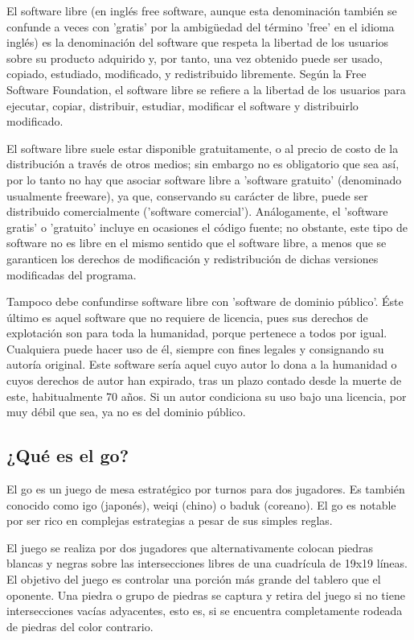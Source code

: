 \documentclass[12pt,a4paper]{report}
\begin{document}
El software libre (en inglés free software, aunque esta denominación también se
confunde a veces con 'gratis' por la ambigüedad del término 'free' en el idioma
inglés) es la denominación del software que respeta la libertad de los usuarios
sobre su producto adquirido y, por tanto, una vez obtenido puede ser usado,
copiado, estudiado, modificado, y redistribuido libremente. Según la Free
Software Foundation, el software libre se refiere a la libertad de los usuarios
para ejecutar, copiar, distribuir, estudiar, modificar el software y
distribuirlo modificado.

El software libre suele estar disponible gratuitamente, o al precio de costo de
la distribución a través de otros medios; sin embargo no es obligatorio que sea
así, por lo tanto no hay que asociar software libre a 'software gratuito'
(denominado usualmente freeware), ya que, conservando su carácter de libre,
puede ser distribuido comercialmente ('software comercial'). Análogamente, el
'software gratis' o 'gratuito' incluye en ocasiones el código fuente; no
obstante, este tipo de software no es libre en el mismo sentido que el software
libre, a menos que se garanticen los derechos de modificación y redistribución
de dichas versiones modificadas del programa.

Tampoco debe confundirse software libre con 'software de dominio público'. Éste
último es aquel software que no requiere de licencia, pues sus derechos de
explotación son para toda la humanidad, porque pertenece a todos por igual.
Cualquiera puede hacer uso de él, siempre con fines legales y consignando su
autoría original. Este software sería aquel cuyo autor lo dona a la humanidad o
cuyos derechos de autor han expirado, tras un plazo contado desde la muerte de
este, habitualmente 70 años. Si un autor condiciona su uso bajo una licencia,
por muy débil que sea, ya no es del dominio público.


\subsection{¿Qué es el go?}

El go es un juego de mesa estratégico por turnos para dos jugadores. Es 
también conocido como igo (japonés), weiqi (chino) o baduk (coreano). El go 
es notable por ser rico en complejas estrategias a pesar de sus simples reglas.

El juego se realiza por dos jugadores que alternativamente colocan piedras
blancas y negras sobre las intersecciones libres de una cuadrícula de 19x19
líneas. El objetivo del juego es controlar una porción más grande del tablero
que el oponente. Una piedra o grupo de piedras se captura y retira del juego si
no tiene intersecciones vacías adyacentes, esto es, si se encuentra
completamente rodeada de piedras del color contrario.
\end{document}
